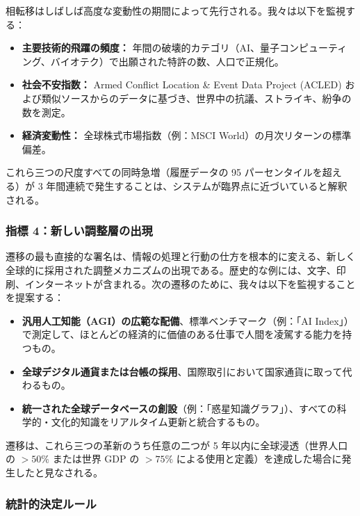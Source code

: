 \documentclass[12pt,a4paper]{article}
\theoremstyle{remark}
\begin{document}
	相転移はしばしば高度な変動性の期間によって先行される。我々は以下を監視する：
	
	\begin{itemize}
		\item \textbf{主要技術的飛躍の頻度：} 年間の破壊的カテゴリ（AI、量子コンピューティング、バイオテク）で出願された特許の数、人口で正規化。
		\item \textbf{社会不安指数：} Armed Conflict Location \& Event Data Project (ACLED) および類似ソースからのデータに基づき、世界中の抗議、ストライキ、紛争の数を測定。
		\item \textbf{経済変動性：} 全球株式市場指数（例：MSCI World）の月次リターンの標準偏差。
	\end{itemize}
	
	これら三つの尺度すべての同時急増（履歴データの 95 パーセンタイルを超える）が 3 年間連続で発生することは、システムが臨界点に近づいていると解釈される。
	
	\subsubsection{指標 4：新しい調整層の出現}
	
	遷移の最も直接的な署名は、情報の処理と行動の仕方を根本的に変える、新しく全球的に採用された調整メカニズムの出現である。歴史的な例には、文字、印刷、インターネットが含まれる。次の遷移のために、我々は以下を監視することを提案する：
	
	\begin{itemize}
		\item \textbf{汎用人工知能（AGI）の広範な配備}、標準ベンチマーク（例：「AI Index」）で測定して、ほとんどの経済的に価値のある仕事で人間を凌駕する能力を持つもの。
		\item \textbf{全球デジタル通貨または台帳の採用}、国際取引において国家通貨に取って代わるもの。
		\item \textbf{統一された全球データベースの創設}（例：「惑星知識グラフ」）、すべての科学的・文化的知識をリアルタイム更新と統合するもの。
	\end{itemize}
	
	遷移は、これら三つの革新のうち任意の二つが 5 年以内に全球浸透（世界人口の \(>50\%\) または世界 GDP の \(>75\%\) による使用と定義）を達成した場合に発生したと見なされる。
	
	\subsubsection{統計的決定ルール}
	
\end{document}
